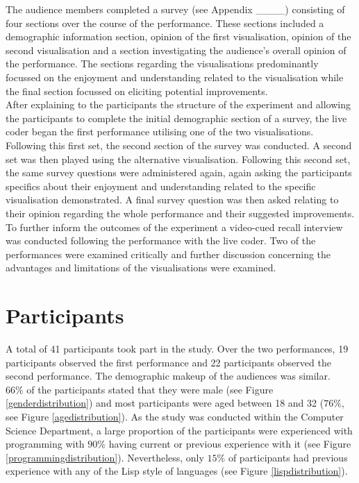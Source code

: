 \documentclass[12pt]{article}
\begin{document}
The audience members completed a survey (see Appendix \_\_\_\_) consisting of four sections over the course of the performance. These sections included a demographic information section, opinion of the first visualisation, opinion of the second visualisation and a section investigating the audience's overall opinion of the performance. The sections regarding the visualisations predominantly focussed on the enjoyment and understanding related to the visualisation while the final section focussed on eliciting potential improvements.\\

After explaining to the participants the structure of the experiment and allowing the participants to complete the initial demographic section of a survey, the live coder began the first performance utilising one of the two visualisations. Following this first set, the second section of the survey was conducted. A second set was then played using the alternative visualisation. Following this second set, the same survey questions were administered again, again asking the participants specifics about their enjoyment and understanding related to the specific visualisation demonstrated. A final survey question was then asked relating to their opinion regarding the whole performance and their suggested improvements.\\

To further inform the outcomes of the experiment a video-cued recall interview was conducted following the performance with the live coder. Two of the performances were examined critically and further discussion concerning the advantages and limitations of the visualisations were examined.

\section{Participants}

A total of 41 participants took part in the study. Over the two performances, 19 participants observed the first performance and 22 participants observed the second performance. The demographic makeup of the audiences was similar.\\

$66\%$ of the participants stated that they were male (see Figure \ref{genderdistribution}) and most participants were aged between 18 and 32 ($76\%$, see Figure \ref{agedistribution}). As the study was conducted within the Computer Science Department, a large proportion of the participants were experienced with programming with $90\%$ having current or previous experience with it (see Figure \ref{programmingdistribution}). Nevertheless, only $15\%$ of participants had previous experience with any of the Lisp style of languages (see Figure \ref{lispdistribution}).\\
\end{document}
